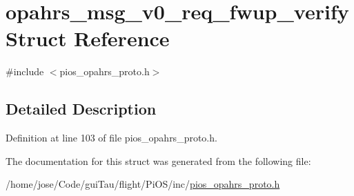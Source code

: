 \hypertarget{structopahrs__msg__v0__req__fwup__verify}{\section{opahrs\-\_\-msg\-\_\-v0\-\_\-req\-\_\-fwup\-\_\-verify Struct Reference}
\label{structopahrs__msg__v0__req__fwup__verify}
}


{\ttfamily \#include $<$pios\-\_\-opahrs\-\_\-proto.\-h$>$}



\subsection{Detailed Description}


Definition at line 103 of file pios\-\_\-opahrs\-\_\-proto.\-h.



The documentation for this struct was generated from the following file\-:\begin{DoxyCompactItemize}
\item 
/home/jose/\-Code/gui\-Tau/flight/\-Pi\-O\-S/inc/\hyperlink{pios__opahrs__proto_8h}{pios\-\_\-opahrs\-\_\-proto.\-h}\end{DoxyCompactItemize}
